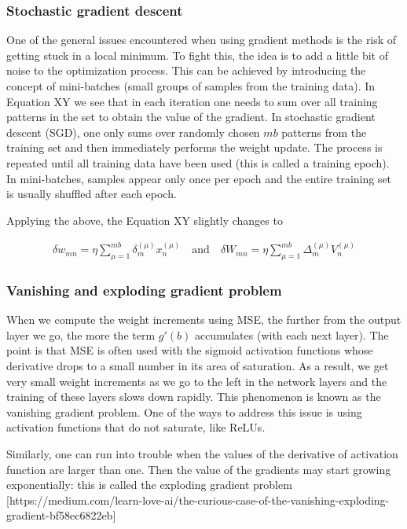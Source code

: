 \subsubsection{Stochastic gradient descent}

One of the general issues encountered when using gradient methods is the risk of getting stuck in a local minimum. To fight this, the idea is to add a little bit of noise to the optimization process. This can be achieved by introducing the concept of mini-batches (small groups of samples from the training data). In Equation XY we see that in each iteration one needs to sum over all training patterns in the set to obtain the value of the gradient. In stochastic gradient descent (SGD), one only sums over randomly chosen $ mb $ patterns from the training set and then immediately performs the weight update. The process is repeated until all training data have been used (this is called a training epoch). In mini-batches, samples appear only once per epoch and the entire training set is usually shuffled after each epoch.

Applying the above, the Equation XY slightly changes to

\begin{gather}
\delta w_{mn} = \eta \sum\limits_{\mu=1}^{mb} \delta_{m}^{(\mu)} x_{n}^{(\mu)}
\quad \text{and} \quad 
\delta W_{mn} = \eta \sum\limits_{\mu=1}^{mb} \Delta_{m}^{(\mu)} V_{n}^{(\mu)}	
\end{gather}

\subsubsection{Vanishing and exploding gradient problem}

When we compute the weight increments using MSE, the further from the output layer we go, the more the term $ g'(b) $ accumulates (with each next layer). The point is that MSE is often used with the sigmoid activation functions whose derivative drops to a small number in its area of saturation. As a result, we get very small weight increments as we go to the left in the network layers and the training of these layers slows down rapidly. This phenomenon is known as the vanishing gradient problem. One of the ways to address this issue is using activation functions that do not saturate, like ReLUs.

Similarly, one can run into trouble when the values of the derivative of activation function are larger than one. Then the value of the gradients may start growing exponentially: this is called the exploding gradient problem [https://medium.com/learn-love-ai/the-curious-case-of-the-vanishing-exploding-gradient-bf58ec6822eb]

